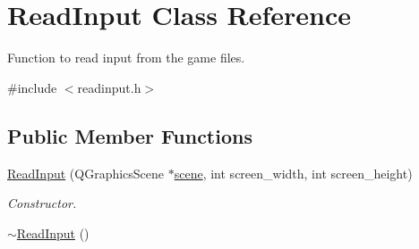 \hypertarget{classReadInput}{\section{Read\-Input Class Reference}
\label{classReadInput}
}


Function to read input from the game files.  




{\ttfamily \#include $<$readinput.\-h$>$}

\subsection*{Public Member Functions}
\begin{DoxyCompactItemize}
\item 
\hyperlink{classReadInput_a25c8fa92ada2fb103817fb1eb1c67020}{Read\-Input} (Q\-Graphics\-Scene $\ast$\hyperlink{classReadInput_a6ef3ea2e71749ad16f4bcd0bdae740c4}{scene}, int screen\-\_\-width, int screen\-\_\-height)
\begin{DoxyCompactList}\small\item\em Constructor. \end{DoxyCompactList}\item 
\hypertarget{classReadInput_aec19e94e448ed46207c55412a61728fa}{\hyperlink{classReadInput_aec19e94e448ed46207c55412a61728fa}{$\sim$\-Read\-Input} ()}\label{classReadInput_aec19e94e448ed46207c55412a61728fa}


\end{DoxyCompactItemize}
